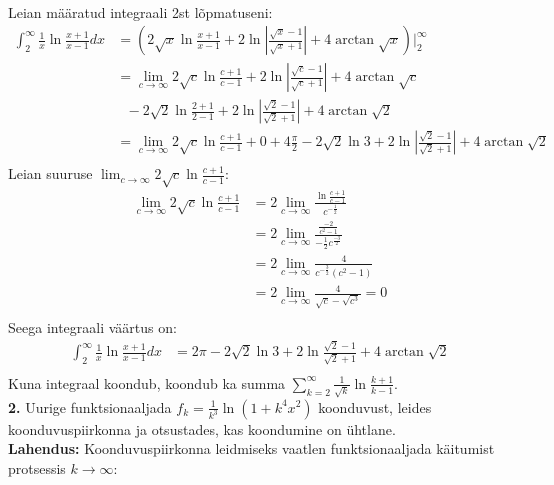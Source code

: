 \documentclass{article}
\begin{document}
\pagebreak\\
Leian m\"a\"aratud integraali 2st l\~opmatuseni:
\begin{equation*}
\begin{aligned}
\int_2^\infty\frac{1}{x}\ln\frac{x+1}{x-1}dx&=\left(2\sqrt{x}\ln\frac{x+1}{x-1}+2\ln\left|\frac{\sqrt{x}-1}{\sqrt{x}+1}\right|+4\arctan\sqrt{x}\right)\Big|_2^\infty\\
&=\lim_{c\to\infty}2\sqrt{c}\ln\frac{c+1}{c-1}+2\ln\left|\frac{\sqrt{c}-1}{\sqrt{c}+1}\right|+4\arctan\sqrt{c}\\
&\ \ \ -2\sqrt{2}\ln\frac{2+1}{2-1}+2\ln\left|\frac{\sqrt{2}-1}{\sqrt{2}+1}\right|+4\arctan\sqrt{2}\\
&=\lim_{c\to\infty}2\sqrt{c}\ln\frac{c+1}{c-1}+0+4\frac{\pi}{2}-2\sqrt{2}\ln3+2\ln\left|\frac{\sqrt{2}-1}{\sqrt{2}+1}\right|+4\arctan\sqrt{2}\\
\end{aligned}
\end{equation*}
Leian suuruse $\lim_{c\to\infty}2\sqrt{c}\ln\frac{c+1}{c-1}$:
\begin{equation*}
\begin{aligned}
\lim_{c\to\infty}2\sqrt{c}\ln\frac{c+1}{c-1}&=2\lim_{c\to\infty}\frac{\ln\frac{c+1}{c-1}}{c^{-\frac{1}{2}}}\\
&=2\lim_{c\to\infty}\frac{\frac{-2}{c^2-1}}{-\frac{1}{2}c^{\frac{-3}{2}}}\\
&=2\lim_{c\to\infty}\frac{4}{c^{-\frac{3}{2}}(c^2-1)}\\
&=2\lim_{c\to\infty}\frac{4}{\sqrt{c}-\sqrt{c^3}}=0\\
\end{aligned}
\end{equation*}
Seega integraali v\"a\"artus on:
\begin{equation*}
\begin{aligned}
\int_2^\infty\frac{1}{x}\ln\frac{x+1}{x-1}dx&=2\pi-2\sqrt{2}\ln3+2\ln\frac{\sqrt{2}-1}{\sqrt{2}+1}+4\arctan\sqrt{2}\\
\end{aligned}
\end{equation*}
Kuna integraal koondub, koondub ka summa $\sum_{k=2}^\infty\frac{1}{\sqrt{k}}\ln\frac{k+1}{k-1}$.
\pagebreak\\
\textbf{2.} Uurige funktsionaaljada $f_k=\frac{1}{k^3}\ln(1+k^4x^2)$ koonduvust, leides koonduvuspiirkonna ja otsustades, kas koondumine on \"uhtlane.\\
\textbf{Lahendus:} Koonduvuspiirkonna leidmiseks vaatlen funktsionaaljada k\"aitumist protsessis $k\to\infty$:
\end{document}
